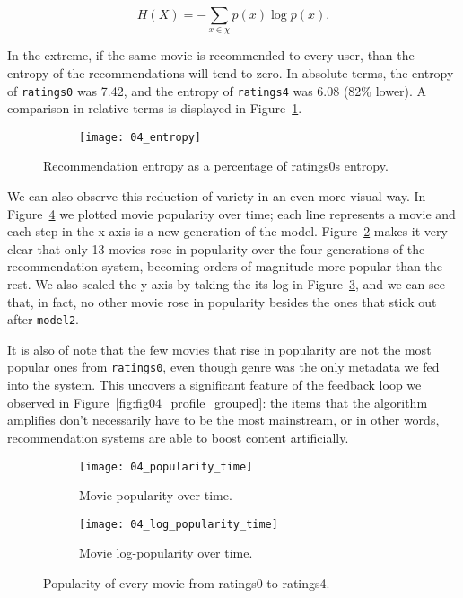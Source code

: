 $$
H(X) = - \sum_{x \in \chi} p(x) \log p(x).
$$

In the extreme, if the same movie is recommended to every user, than the entropy
of the recommendations will tend to zero. In absolute terms, the entropy of
\verb|ratings0| was 7.42, and the entropy of \verb|ratings4| was 6.08 (82\%
lower). A comparison in relative terms is displayed in
Figure~\ref{fig:fig04_entropy}.

\begin{figure}
  \centering
  \begin{subfigure}{0.45\textwidth}
    \centering
    \texttt{[image: 04\_entropy]}
  \end{subfigure}
  \caption{Recommendation entropy as a percentage of ratings0s entropy.
  \label{fig:fig04_entropy}}
\end{figure}

We can also observe this reduction of variety in an even more visual way. In
Figure~\ref{fig:fig04_popularity_time_both} we plotted movie popularity over
time; each line represents a movie and each step in the x-axis is a new
generation of the model. Figure~\ref{fig:fig04_popularity_time} makes it very
clear that only 13 movies rose in popularity over the four generations of the
recommendation system, becoming orders of magnitude more popular than the rest.
We also scaled the y-axis by taking the its log in
Figure~\ref{fig:fig04_log_popularity_time}, and we can see that, in fact, no
other movie rose in popularity besides the ones that stick out after
\verb|model2|.

It is also of note that the few movies that rise in popularity are not the most
popular ones from \verb|ratings0|, even though genre was the only metadata we
fed into the system. This uncovers a significant feature of the feedback loop we
observed in Figure~\ref{fig:fig04_profile_grouped}: the items that the algorithm
amplifies don't necessarily have to be the most mainstream, or in other words,
recommendation systems are able to boost content artificially.

\begin{figure}
  \centering
  \begin{subfigure}{0.45\textwidth}
    \centering
    \texttt{[image: 04\_popularity\_time]}
    \caption{Movie popularity over time.\label{fig:fig04_popularity_time}}
  \end{subfigure}
  \begin{subfigure}{0.45\textwidth}
    \centering
    \texttt{[image: 04\_log\_popularity\_time]}
    \caption{Movie log-popularity over time.\label{fig:fig04_log_popularity_time}}
  \end{subfigure}
  \caption{Popularity of every movie from ratings0 to ratings4.\label{fig:fig04_popularity_time_both}}
\end{figure}


